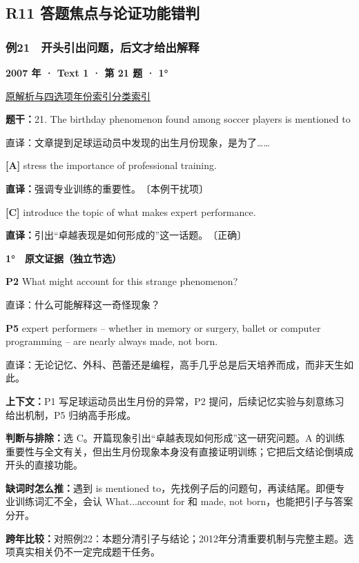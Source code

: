 \documentclass[11pt,a4paper]{article}
\begin{document}
\subsection{R11 答题焦点与论证功能错判}
\subsubsection{例21　开头引出问题，后文才给出解释}\label{case-2007-T1-Q21}
\noindent\textbf{2007 年 · Text 1 · 第 21 题 · 1°}\par\noindent \href{https://zj139.github.io/math-notes/english/a69829b7fe6a2f532d31c053/\#q21}{原解析与四选项}\quad \hyperref[idx-2007-T1-Q21]{年份索引}\quad \hyperref[class-R11]{分类索引}\par\smallskip
\noindent\textbf{题干：}21. The birthday phenomenon found among soccer players is mentioned to\par
直译：文章提到足球运动员中发现的出生月份现象，是为了……\par
{}\noindent\textbf{[A]} stress the importance of professional training.\par\nopagebreak
\noindent\textbf{直译：}强调专业训练的重要性。　〔本例干扰项〕\par
{}\noindent\textbf{[C]} introduce the topic of what makes expert performance.\par\nopagebreak
\noindent\textbf{直译：}引出“卓越表现是如何形成的”这一话题。　〔正确〕\par
\begin{evidence}\textbf{1°　原文证据（独立节选）}\par
\textbf{P2} What might account for this strange phenomenon?\par 直译：什么可能解释这一奇怪现象？\par
\textbf{P5} expert performers – whether in memory or surgery, ballet or computer programming – are nearly always made, not born.\par 直译：无论记忆、外科、芭蕾还是编程，高手几乎总是后天培养而成，而非天生如此。\par
\end{evidence}
\noindent\textbf{上下文：}P1 写足球运动员出生月份的异常，P2 提问，后续记忆实验与刻意练习给出机制，P5 归纳高手形成。\par
\noindent\textbf{判断与排除：}选 C。开篇现象引出“卓越表现如何形成”这一研究问题。A 的训练重要性与全文有关，但出生月份现象本身没有直接证明训练；它把后文结论倒填成开头的直接功能。\par
\noindent\textbf{缺词时怎么推：}遇到 is mentioned to，先找例子后的问题句，再读结尾。即便专业训练词汇不全，会认 What...account for 和 made, not born，也能把引子与答案分开。\par
\noindent\textbf{跨年比较：}对照例22：本题分清引子与结论；2012年分清重要机制与完整主题。选项真实相关仍不一定完成题干任务。\par
\clearpage
\end{document}
